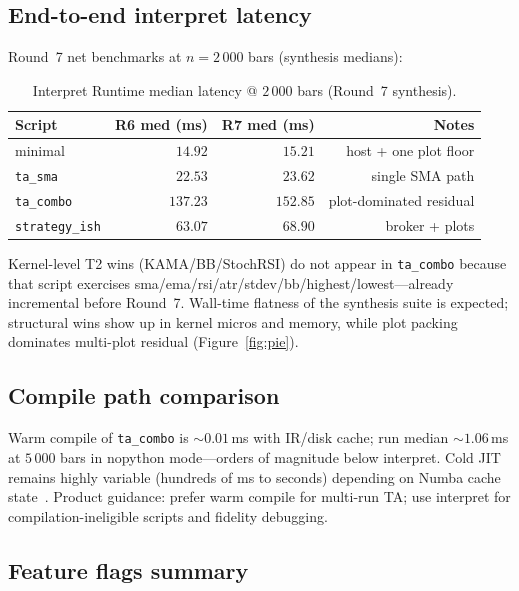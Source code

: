 \documentclass[11pt,a4paper]{article}
\begin{document}
\subsection{End-to-end interpret latency}

Round~7 net benchmarks at $n=2\,000$ bars (synthesis medians):

\begin{table}[t]
\centering
\caption{Interpret Runtime median latency @ $2\,000$ bars (Round~7 synthesis).}
\label{tab:latency}
\begin{tabular}{lrrr}
\toprule
Script & R6 med (ms) & R7 med (ms) & Notes \\
\midrule
minimal & $14.92$ & $\mathbf{15.21}$ & host + one plot floor \\
\texttt{ta\_sma} & $22.53$ & $\mathbf{23.62}$ & single SMA path \\
\texttt{ta\_combo} & $137.23$ & $\mathbf{152.85}$ & plot-dominated residual \\
\texttt{strategy\_ish} & $63.07$ & $\mathbf{68.90}$ & broker + plots \\
\bottomrule
\end{tabular}
\end{table}

Kernel-level T2 wins (KAMA/BB/StochRSI) do not appear in \texttt{ta\_combo}
because that script exercises sma/ema/rsi/atr/stdev/bb/highest/lowest---already
incremental before Round~7.  Wall-time flatness of the synthesis suite is
expected; structural wins show up in kernel micros and memory, while plot
packing dominates multi-plot residual (Figure~\ref{fig:pie}).

\subsection{Compile path comparison}

Warm compile of \texttt{ta\_combo} is $\sim 0.01$\,ms with IR/disk cache; run
median $\sim 1.06$\,ms at $5\,000$ bars in nopython mode---orders of magnitude
below interpret.  Cold JIT remains highly variable (hundreds of ms to seconds)
depending on Numba cache state~\citep{lam2015numba}.  Product guidance: prefer
warm compile for multi-run TA; use interpret for compilation-ineligible scripts
and fidelity debugging.

\subsection{Feature flags summary}
\end{document}
